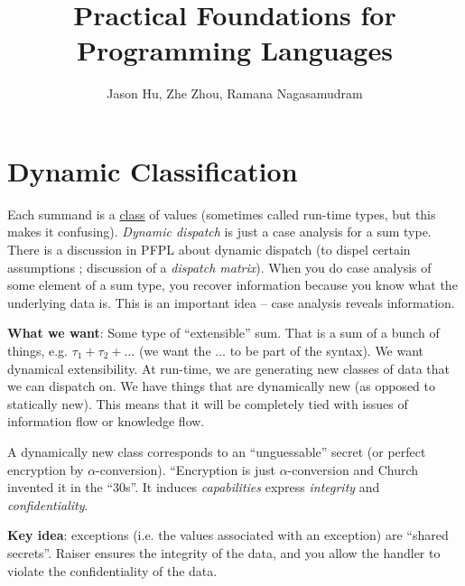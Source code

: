 \documentclass[11pt]{article}
\title{Practical Foundations for Programming Languages}
\author{Jason Hu, Zhe Zhou, Ramana Nagasamudram}
\date{}
\newcommand{\T}[1]{\ensuremath{\mathtt{#1}}}
\begin{document}
\maketitle

\section{Dynamic Classification}
\label{sec:dc}




Each summand is a \underline{class} of values (sometimes called run-time
types, but this makes it confusing). \emph{Dynamic dispatch} is just a
case analysis for a sum type.  There is a discussion in PFPL about dynamic
dispatch (to dispel certain assumptions ; discussion of a \emph{dispatch
matrix}).
When you do case analysis of some element of a sum type, you recover information
because you know what the underlying data is.  This is an important idea
-- case analysis reveals information.

\vspace{1em}

\textbf{What we want}: Some type of ``extensible'' sum.  That is a sum of a bunch
of things, e.g. $\tau_{1}+\tau_{2}+\dots$ (we want the $\dots$ to be part
of the syntax).  We want dynamical extensibility.  At run-time, we are
generating new classes of data that we can dispatch on.  We have things
that are dynamically new (as opposed to statically new).  This
means that it will be completely tied with issues of information flow or
knowledge flow.

A dynamically new class corresponds to an ``unguessable'' secret (or
perfect encryption by $\alpha$-conversion).  ``Encryption is just
$\alpha$-conversion and Church invented it in the ``30s''.
It induces \emph{capabilities} express \emph{integrity} and
\emph{confidentiality}.

\textbf{Key idea}: exceptions (i.e. the values associated with an
exception) are ``shared secrets''.  Raiser ensures the integrity of the
data, and you allow the handler to violate the confidentiality of the
data.
\end{document}
